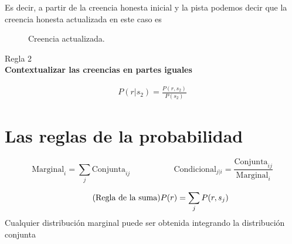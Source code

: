 \documentclass[a4paper,10pt]{book}
\begin{document}
Es decir, a partir de la creencia honesta inicial y la pista podemos decir que la creencia honesta actualizada en este caso es
\begin{figure}[H]
 \centering
{} 
\caption{Creencia actualizada.}
\label{fig:creencia_condicional}
\end{figure}

\begin{framed} \centering
  Regla 2 \\
\textbf{Contextualizar las creencias en partes iguales} 
\end{framed}

\begin{align*}
 P(r|s_2) = \frac{P(r, s_2)}{P(s_2)}
 \end{align*} 
 


\section{Las reglas de la probabilidad}

\begin{equation*}
  \text{Marginal}_{i} = \sum_j \text{Conjunta}_{ij}  \ \ \ \ \ \ \ \ \  \ \ \ \ \ \ \ \ \ \ \ \ \ \ \  \text{Condicional}_{j|i} = \frac{\text{Conjunta}_{ij}}{\text{Marginal}_{i}}
\end{equation*}


\begin{equation}\tag{\text{Regla de la suma}}
 P(r) = \sum_j P(r,s_j)
\end{equation}
Cualquier distribución marginal puede ser obtenida integrando la distribución conjunta
\end{document}
